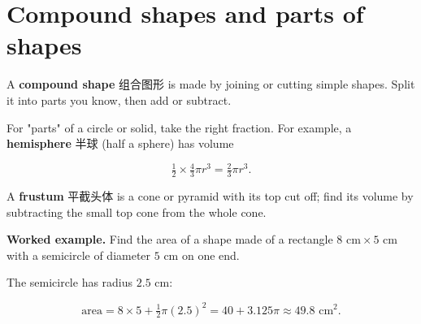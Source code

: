 \documentclass[11pt]{article}
\begin{document}
\section*{Compound shapes and parts of shapes}

A \textbf{compound shape} 组合图形 is made by joining or cutting simple shapes. Split it into parts you know, then add or subtract.

For "parts" of a circle or solid, take the right fraction. For example, a \textbf{hemisphere} 半球 (half a sphere) has volume

\[
\tfrac{1}{2} \times \tfrac{4}{3}\pi r^{3} = \tfrac{2}{3}\pi r^{3}.
\]

A \textbf{frustum} 平截头体 is a cone or pyramid with its top cut off; find its volume by subtracting the small top cone from the whole cone.

\textbf{Worked example.} Find the area of a shape made of a rectangle $8\text{ cm} \times 5\text{ cm}$ with a semicircle of diameter $5\text{ cm}$ on one end.

The semicircle has radius $2.5\text{ cm}$:

\[
\text{area} = 8 \times 5 + \tfrac{1}{2}\pi (2.5)^{2} = 40 + 3.125\pi \approx 49.8\text{ cm}^{2}.
\]
\end{document}
